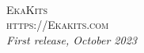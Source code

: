 
\begingroup
\thispagestyle{empty}
\centering
\vspace*{5cm}
\par\normalfont\fontsize{35}{35}\sffamily\selectfont
\vspace*{1cm}
\endgroup


\newpage
~\vfill
\thispagestyle{empty}


\noindent \textsc{EkaKits}\\

\noindent \textsc{https://Ekakits.com}\\ %

\noindent \textit{First release, October 2023} %